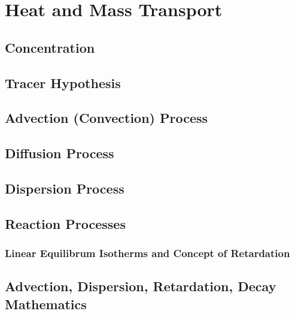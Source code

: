 \section{Heat and Mass Transport}
\subsection{Concentration}
\subsection{Tracer Hypothesis}
\subsection{Advection (Convection) Process}
\subsection{Diffusion Process}
\subsection{Dispersion Process}
\subsection{Reaction Processes}
\subsubsection{Linear Equilibrum Isotherms and Concept of Retardation}
\subsection{Advection, Dispersion, Retardation, Decay Mathematics}
